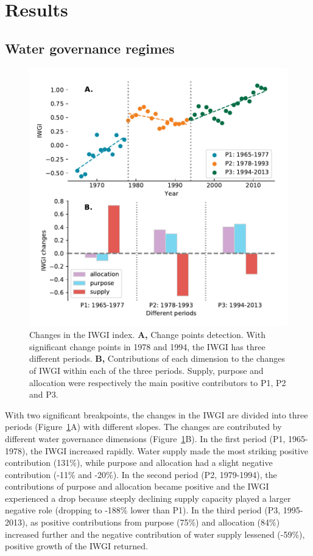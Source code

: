 \documentclass[9pt, twocolumn, twoside, lineno]{pnas-new}
\begin{document}
\section*{Results}
\subsection*{Water governance regimes}

\begin{figure}[ht!]
	\centering
	\includegraphics[width=\linewidth]{../../figures/main/index.pdf}
	\caption{Changes in the IWGI index. 
	\textbf{A,} Change points detection. With significant change points in 1978 and 1994, the IWGI has three different periods.
	\textbf{B,} Contributions of each dimension to the changes of IWGI within each of the three periods. Supply, purpose and allocation were respectively the main positive contributors to P1, P2 and P3.
	}
	\label{fig:IWGI}
\end{figure}

With two significant breakpoints, the changes in the IWGI are divided into three periods (Figure~\ref{fig:IWGI}A) with different slopes. 
The changes are contributed by different water governance dimensions (Figure~\ref{fig:IWGI}B).
In the first period (P1, 1965-1978), the IWGI increased rapidly. 
Water supply made the most striking positive contribution (131\%), while purpose and allocation had a slight negative contribution (-11\% and -20\%).
In the second period (P2, 1979-1994), the contributions of purpose and allocation became positive and the IWGI experienced a drop because steeply declining supply capacity played a larger negative role (dropping to -188\% lower than P1). 
In the third period (P3, 1995-2013), as positive contributions from purpose (75\%) and allocation (84\%) increased further and the negative contribution of water supply lessened (-59\%), positive growth of the IWGI returned.
\end{document}
